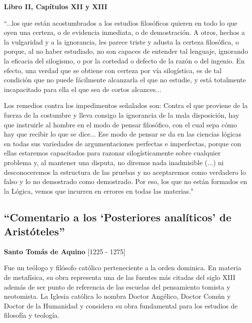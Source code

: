 \documentclass{article}
\begin{document}
\begin{center}
    \large{\textbf{Libro II, Capítulos XII y XIII}}
\end{center}
    
    ``...los que están acostumbrados a los estudios filosóficos quieren en todo lo que oyen una certeza, o de evidencia inmediata, o de demostración. A otros, hechos a la vulgaridad y a la ignorancia, les parece triste y adusta la certeza filosófica, o porque, al no haber estudiado, no son capaces de entender tal lenguaje, ignorando la eficacia del silogismo, o por la cortedad o defecto de la razón o del ingenio. En efecto, una verdad que se obtiene con certeza por vía silogística, es de tal condición que no puede fácilmente alcanzarla el que no estudie, y está totalmente incapacitado para ella el que sea de cortos alcances... \par
    
    Los remedios contra los impedimentos señalados son: Contra el que proviene de la fuerza de la costumbre y lleva consigo la ignorancia de la mala disposición, hay que instruirle al hombre en el modo de pensar filosófico, con el cual sepa cómo hay que recibir lo que se dice... Ese modo de pensar se da en las ciencias lógicas en todas sus variedades de argumentaciones perfectas e imperfectas, porque con ellas estaremos capacitados para razonar silogísticamente sobre cualquier problema y, al mantener una disputa, no diremos nada inadmisible (...) ni desconoceremos la estructura de las pruebas y no aceptaremos como verdadero lo falso y lo no demostrado como demostrado. Por eso, los que no están formados en la Lógica, vemos que incurren en errores en todas las materias." \par
    

    
\subsection{``Comentario a los `Posteriores analíticos' de Aristóteles''}
    
    \begin{center}
        \large{\textbf{Santo Tomás de Aquino} [1225 - 1275]}
    \end{center}

    Fue un teólogo y filósofo católico perteneciente a la orden dominica. En materia de metafísica, su obra representa una de las fuentes más citadas del siglo XIII además de ser punto de referencia de las escuelas del pensamiento tomista y neotomista. La Iglesia católica lo nombra Doctor Angélico, Doctor Común y Doctor de la Humanidad y considera su obra fundamental para los estudios de filosofía y teología. \par
    
\end{document}
